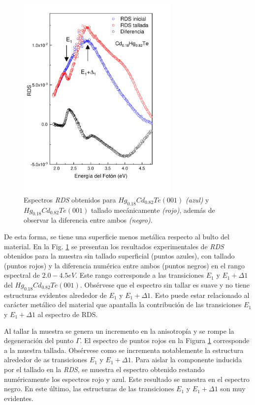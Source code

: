 \begin{figure}[H]
    \centering
    \includegraphics[width=0.7\textwidth]{figures/chap4/hgcdte-strained/rds-results/hgcdte_rds_comparision.pdf}
        \caption{Espectros \textit{RDS} obtenidos para $ Hg_{0.18}Cd_{0.82}Te (001) $ \textit{(azul)} y 
        $ Hg_{0.18}Cd_{0.82}Te (001)$ tallado mecánicamente \textit{(rojo)}, además de observar la diferencia entre ambos \textit{(negro)}.}
    \label{fig:hgcdte_rds_comparision}
\end{figure}

De esta forma, se tiene una superficie menos metálica respecto al bulto del material. En la Fig. 
\ref{fig:hgcdte_rds_comparision} se presentan los resultados experimentales de \textit{RDS} obtenidos para la muestra sin tallado superficial (puntos azules), con tallado (puntos rojos) y la diferencia numérica entre ambos (puntos negros) en el rango espectral de $ 2.0-4.5 eV $. 
Este rango corresponde a las transiciones $E_{1}$ y $E_{1}+\Delta1$ del $ Hg_{0.18}Cd_{0.82}Te (001)$\cite{Camacho2005}. Obsérvese que el espectro sin tallar es suave y no tiene estructuras evidentes alrededor de $E_{1}$ y $E_{1}+\Delta1$. Esto puede estar relacionado al carácter metálico del material que apantalla la contribución de las transiciones $E_{1}$ y $E_{1}+\Delta1$ al espectro de RDS. 

Al tallar la muestra se genera un incremento en la anisotropía y se rompe la degeneración del punto $\Gamma$. El espectro de puntos rojos en la Figura \ref{fig:hgcdte_rds_comparision} corresponde a la muestra tallada. Obsérvese como se incrementa notablemente la estructura alrededor de as transiciones $E_{1}$ y $E_{1}+\Delta1$. Para aislar la componente inducida por el tallado en la \textit{RDS}, se muestra el espectro obtenido restando numéricamente los espectros rojo y azul. Este resultado se muestra en el espectro negro. En este último, las estructuras de las transiciones $E_{1}$ y $E_{1}+\Delta1$ son muy evidentes.

